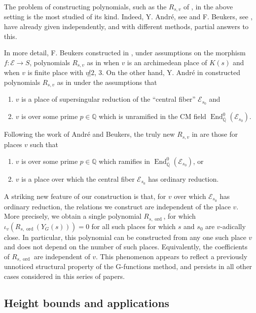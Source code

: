 \documentclass[12pt,twoside,a4paper]{article}
\theoremstyle{plain}%
\DeclareMathOperator{\End}{End}
\DeclareMathOperator{\ord}{ord}
\newcommand{\Q}{\mathbb{Q}}
\newcommand{\CE}{\mathcal{E}}
\begin{document}
The problem of constructing polynomials, such as the $R_{s,v}$ of , in the above setting is the most studied of its kind. Indeed, Y. Andr\'e, see \cite{andremots} and F. Beukers, see \cite{beukers}, have already given independently, and with different methods, partial answers to this. 

In more detail, F. Beukers constructed in \cite{beukers}, under assumptions on the morphism $f:\CE \rightarrow S$, polynomials $R_{s,v}$ as in  when $v$ is an archimedean place of $K(s)$ and when $v$ is finite place with $\displaystyle{v\not|2}$, $3$. On the other hand, Y. Andr\'e in \cite{andremots} constructed polynomials $R_{s,v}$ as in  under the assumptions that 
\begin{enumerate}
\item $v$ is a place of supersingular reduction of the ``central fiber'' $\CE_{s_0}$ and 
\item $v$ is over some prime $p\in \Q$ which is unramified in the CM field $\End^{0}_{\bar{\Q}}(\CE_{s_0})$.
\end{enumerate}

Following the work of Andr\'e and Beukers, the truly new $R_{s,v}$ in  are those for places $v$ such that 
\begin{enumerate}
	\item $v$ is over some prime $p\in \Q$ which ramifies in $\End^{0}_{\bar{\Q}}(\CE_{s_0})$, or 
	\item $v$ is a place over which the central fiber $\CE_{s_0}$ has ordinary reduction.
\end{enumerate}

A striking new feature of our construction is that, for $v$ over which $\CE_{s_0}$ has ordinary reduction, the relations we construct are independent of the place $v$. More precisely, we obtain a single polynomial $R_{s,\ord}$, for which $\iota_v(R_{s,\ord}(Y_G(s)))=0$ for all such places for which $s$ and $s_0$ are $v$-adically close. In particular, this polynomial can be constructed from any one such place $v$ and does not depend on the number of such places. Equivalently, the coefficients of $R_{s,\ord}$ are independent of $v$. This phenomenon appears to reflect a previously unnoticed structural property of the G-functions method, and persists in all other cases considered in this series of papers.

\subsection{Height bounds and applications}\label{section:heightboundsintro}
\end{document}
